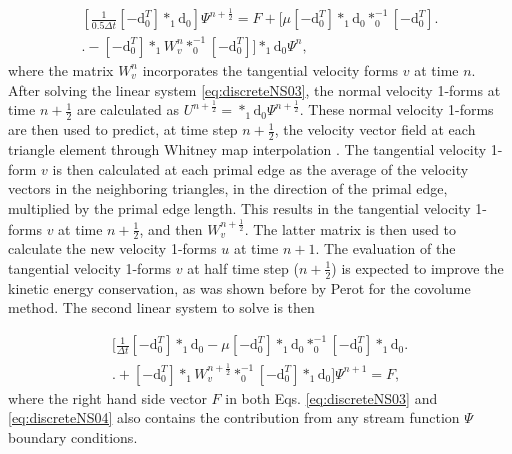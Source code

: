\documentclass[final,12pt,times]{elsarticle}
\begin{document}
\begin{multline}
\label{eq:discreteNS03}
\left[\frac{1}{0.5 \Delta t} [-\textrm{d}^T_0] \ast_1 \textrm{d}_0 \right] \Psi^{n+\frac{1}{2}} = F + \biggl[ \mu [-\textrm{d}^T_0] \ast_1 \textrm{d}_0 \ast^{-1}_0 [-\textrm{d}^T_0] \biggr. \\ \biggl. - [-\textrm{d}^T_0] \ast_1 W^n_v \ast^{-1}_0 [-\textrm{d}^T_0] \biggr] \ast_1 \textrm{d}_0 \Psi^n, 
\end{multline} 
where the matrix $W^n_v$ incorporates the tangential velocity forms $v$ at time $n$. After solving the linear system \eqref{eq:discreteNS03}, the normal velocity 1-forms at time $n+\frac{1}{2}$ are calculated as $U^{n+\frac{1}{2}} = \ast_1 \textrm{d}_0 \Psi^{n+\frac{1}{2}}$. These normal velocity 1-forms are then used to predict, at time step $n+\frac{1}{2}$, the velocity vector field at each triangle element through Whitney map interpolation \cite{HiNaCh2015}. The tangential velocity 1-form $v$ is then calculated at each primal edge as the average of the velocity vectors in the neighboring triangles, in the direction of the primal edge, multiplied by the primal edge length. This results in the tangential velocity 1-forms $v$ at time $n+\frac{1}{2}$, and then $W^{n+\frac{1}{2}}_v$. The latter matrix is then used to calculate the new velocity 1-forms $u$ at time $n+1$. The evaluation of the tangential velocity 1-forms $v$ at half time step ($n+\frac{1}{2}$) is expected to improve the kinetic energy conservation, as was shown before by Perot \cite{perot2000conservation} for the covolume method. The second linear system to solve is then

\begin{multline}
\label{eq:discreteNS04}
\biggl[ \frac{1}{\Delta t} [-\textrm{d}^T_0] \ast_1 \textrm{d}_0  - \mu [-\textrm{d}^T_0] \ast_1 \textrm{d}_0 \ast^{-1}_0 [-\textrm{d}^T_0] \ast_1 \textrm{d}_0  \biggr. \\ \biggl. + [-\textrm{d}^T_0] \ast_1 W^{n+\frac{1}{2}}_v \ast^{-1}_0 [-\textrm{d}^T_0] \ast_1 \textrm{d}_0 \biggr] \Psi^{n+1} = F, 
\end{multline}  
where the right hand side vector $F$ in both Eqs. \eqref{eq:discreteNS03} and \eqref{eq:discreteNS04} also contains the contribution from any stream function $\Psi$ boundary conditions.
\end{document}
